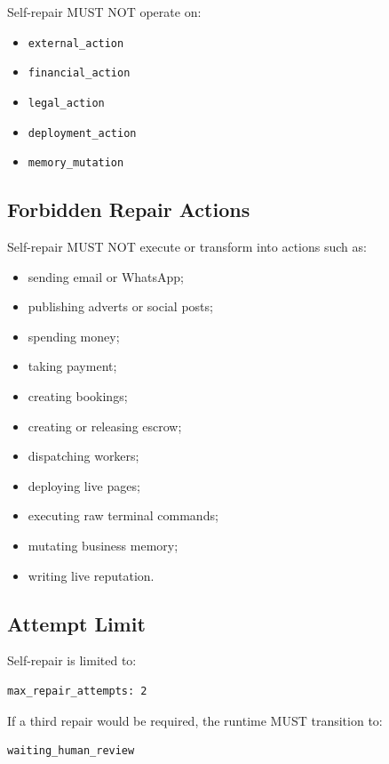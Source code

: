 Self-repair MUST NOT operate on:

\begin{itemize}
  \item \texttt{external\_action}
  \item \texttt{financial\_action}
  \item \texttt{legal\_action}
  \item \texttt{deployment\_action}
  \item \texttt{memory\_mutation}
\end{itemize}

\subsection{Forbidden Repair Actions}

Self-repair MUST NOT execute or transform into actions such as:

\begin{itemize}
  \item sending email or WhatsApp;
  \item publishing adverts or social posts;
  \item spending money;
  \item taking payment;
  \item creating bookings;
  \item creating or releasing escrow;
  \item dispatching workers;
  \item deploying live pages;
  \item executing raw terminal commands;
  \item mutating business memory;
  \item writing live reputation.
\end{itemize}

\subsection{Attempt Limit}

Self-repair is limited to:

\begin{verbatim}
max_repair_attempts: 2
\end{verbatim}

If a third repair would be required, the runtime MUST transition to:

\begin{verbatim}
waiting_human_review
\end{verbatim}

